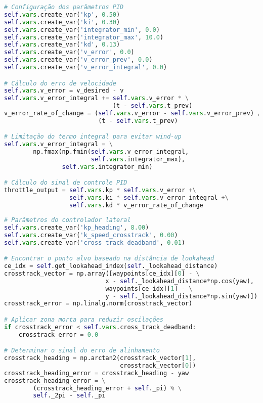\documentclass[
	12pt,				%
	oneside, %
	a4paper,			%
	english,			%
	french,				%
	spanish,			%
	brazil				%
	]{abntex2}
\begin{document}
\begin{apendicesenv}
\begin{lstlisting}[language=Python, caption=Implementação do controle longitudinal PID., label=lst:longitudinal-control]
# Configuração dos parâmetros PID
self.vars.create_var('kp', 0.50)
self.vars.create_var('ki', 0.30)
self.vars.create_var('integrator_min', 0.0)
self.vars.create_var('integrator_max', 10.0)
self.vars.create_var('kd', 0.13)
self.vars.create_var('v_error', 0.0)
self.vars.create_var('v_error_prev', 0.0)
self.vars.create_var('v_error_integral', 0.0)

# Cálculo do erro de velocidade
self.vars.v_error = v_desired - v
self.vars.v_error_integral += self.vars.v_error * \
                              (t - self.vars.t_prev)
v_error_rate_of_change = (self.vars.v_error - self.vars.v_error_prev) /\
                          (t - self.vars.t_prev)

# Limitação do termo integral para evitar wind-up
self.vars.v_error_integral = \
        np.fmax(np.fmin(self.vars.v_error_integral,
                        self.vars.integrator_max),
                self.vars.integrator_min)

# Cálculo do sinal de controle PID
throttle_output = self.vars.kp * self.vars.v_error +\
                  self.vars.ki * self.vars.v_error_integral +\
                  self.vars.kd * v_error_rate_of_change
\end{lstlisting}

\begin{lstlisting}[language=Python, caption=Implementação do controle lateral por perseguição pura., label=lst:lateral-control]
# Parâmetros do controlador lateral
self.vars.create_var('kp_heading', 8.00)
self.vars.create_var('k_speed_crosstrack', 0.00)
self.vars.create_var('cross_track_deadband', 0.01)

# Encontrar o ponto alvo baseado na distância de lookahead
ce_idx = self.get_lookahead_index(self._lookahead_distance)
crosstrack_vector = np.array([waypoints[ce_idx][0] - \
                            x - self._lookahead_distance*np.cos(yaw),
                            waypoints[ce_idx][1] - \
                            y - self._lookahead_distance*np.sin(yaw)])
crosstrack_error = np.linalg.norm(crosstrack_vector)

# Aplicar zona morta para reduzir oscilações
if crosstrack_error < self.vars.cross_track_deadband:
    crosstrack_error = 0.0

# Determinar o sinal do erro de alinhamento
crosstrack_heading = np.arctan2(crosstrack_vector[1],
                                crosstrack_vector[0])
crosstrack_heading_error = crosstrack_heading - yaw
crosstrack_heading_error = \
        (crosstrack_heading_error + self._pi) % \
        self._2pi - self._pi


\end{lstlisting}
\end{apendicesenv}
\end{document}
